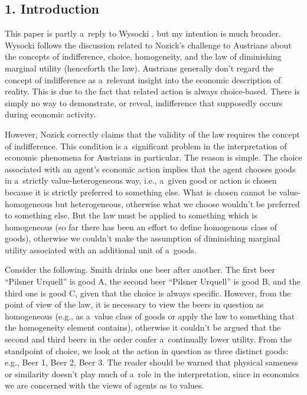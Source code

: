 
\subsection*{1. Introduction }



This paper is partly a~reply to Wysocki 
\parencite*[][]{}, %
 but my intention is much broader. Wysocki follows the discussion related to Nozick's 
\parencite*[][]{} %
 challenge to Austrians about the concepts of indifference, choice, homogeneity, and the law of diminishing marginal utility (henceforth the law). Austrians generally don't regard the concept of indifference as a~relevant insight into the economic description of reality. This is due to the fact that related action is always choice-based. There is simply no way to demonstrate, or reveal, indifference that supposedly occurs during economic activity.



However, Nozick 
\parencite*[][]{} %
 correctly claims that the validity of the law requires the concept of indifference. This condition is a~significant problem in the interpretation of economic phenomena for Austrians in particular. The reason is simple. The choice associated with an agent's economic action implies that the agent chooses goods in a~strictly value-heterogeneous way, i.e., a~given good or action is chosen because it is strictly preferred to something else. What is chosen cannot be value-homogeneous but heterogeneous, otherwise what we choose wouldn't be preferred to something else. But the law must be applied to something which is homogeneous (so far there has been an effort to define homogenous class of goods), otherwise we couldn't make the assumption of diminishing marginal utility associated with an additional unit of a~goods.



Consider the following. Smith drinks one beer after another. The first beer ``Pilsner Urquell'' is good A, the second beer ``Pilsner Urquell'' is good B, and the third one is good C, given that the choice is always specific. However, from the point of view of the law, it is necessary to view the beers in question as homogeneous (e.g., as a~value class of goods or apply the law to something that the homogeneity element contains), otherwise it couldn't be argued that the second and third beers in the order confer a~continually lower utility. From the standpoint of choice, we look at the action in question as three distinct goods: e.g., Beer 1, Beer 2, Beer 3. The reader should be warned that physical sameness or similarity doesn't play much of a~role in the interpretation, since in economics we are concerned with the views of agents as to values.



